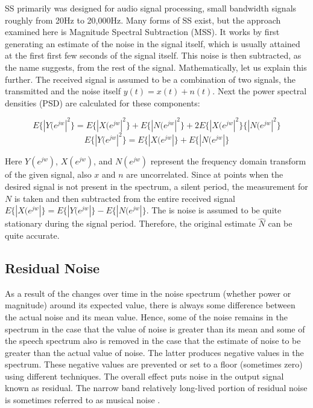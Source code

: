 SS primarily was designed for audio signal processing, small bandwidth signals roughly from 20Hz to 20,000Hz.  Many forms of SS exist, but the approach examined here is Magnitude Spectral Subtraction (MSS).  It works by first generating an estimate of the noise in the signal itself, which is usually attained at the first first few seconds of the signal itself.  This noise is then subtracted, as the name suggests, from the rest of the signal.  Mathematically, let us explain this further.  The received signal is assumed to be a combination of two signals, the transmitted and the noise itself \(y(t) = x(t) + n(t)\).  Next the power spectral densities (PSD) are calculated for these components:

\[ E\{|Y(e^{jw}|^{2}\}= E\{|X(e^{jw}|^{2}\} + E\{|N(e^{jw}|^{2}\} + 2E\{|X(e^{jw}|^{2}\}\{|N(e^{jw}|^{2}\}\]
\[ E\{|Y(e^{jw}|^{2}\}= E\{|X(e^{jw}|\} + E\{|N(e^{jw}|\}  \]

Here \(Y(e^{jw})\), \(X(e^{jw})\), and \(N(e^{jw})\) represent the frequency domain transform of the given signal, also \(x\) and \(n\) are uncorrelated.  Since at points when the desired signal is not present in the spectrum, a silent period, the measurement for \(N\) is taken and then subtracted from the entire received signal \(E\{|X(e^{jw}|\}= E\{|Y(e^{jw}|\} - E\{|N(e^{jw}|\}\).  The is noise is assumed to be quite stationary during the signal period.  Therefore, the original estimate \(\hat{N}\) can be quite accurate.\\

\subsection{Residual Noise}

As a result of the changes over time in the noise spectrum (whether power or magnitude) around its expected value, there is always some difference between the actual noise and its mean value. Hence, some of the noise remains in the spectrum in the case that the value of noise is greater than its mean and some of the speech spectrum also is removed in the case that the estimate of noise to be greater than the actual value of noise. The latter produces negative values in the spectrum. These negative values are prevented or set to a floor (sometimes zero) using different techniques. The overall effect puts noise in the output signal known as residual. The narrow band relatively long-lived portion of residual noise is sometimes referred to as musical noise \cite{mnoise}.

